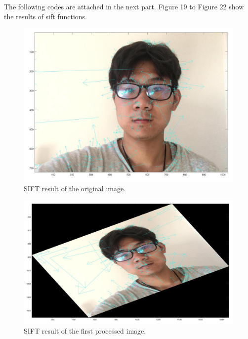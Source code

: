 \documentclass{article}
\begin{document}
The following codes are attached in the next part. Figure 19 to Figure 22 show the results of sift functions.

\begin{figure}[htbp]
    \centering
    \includegraphics[scale = 0.1]{fig19.jpg}
    \caption{SIFT result of the original image.}
    \label{fig19}
\end{figure}

\begin{figure}[htbp]
    \centering
    \includegraphics[scale = 0.1]{fig20.jpg}
    \caption{SIFT result of the first processed image.}
    \label{fig20}
\end{figure}
\end{document}
